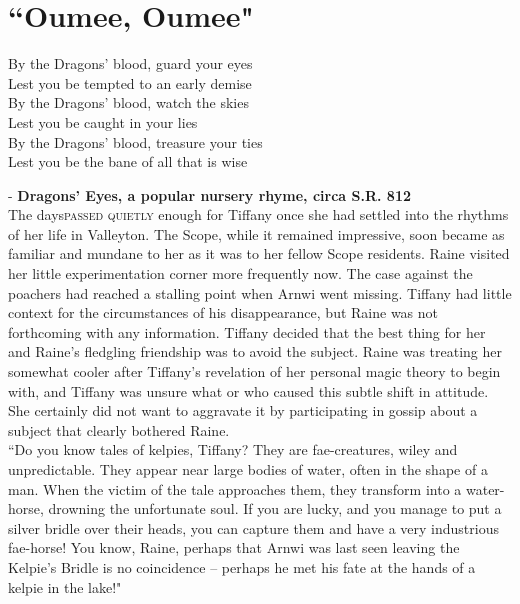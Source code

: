 \chapter{``Oumee, Oumee"}

\begin{center}
By the Dragons' blood, guard your eyes \\
Lest you be tempted to an early demise \\

By the Dragons' blood, watch the skies \\
Lest you be caught in your lies \\

By the Dragons' blood, treasure your ties \\
Lest you be the bane of all that is wise \\
\end{center}

- \textbf{Dragons' Eyes, a popular nursery rhyme, circa S.R. 812}\\

\lettrine{The days}{passed quietly} enough for Tiffany once she had settled into the rhythms of her life in Valleyton.
The Scope, while it remained impressive, soon became as familiar and mundane to her as it was to her fellow Scope residents. Raine visited her little experimentation corner more frequently now. The case against the poachers had reached a stalling point when Arnwi went missing. Tiffany had little context for the circumstances of his disappearance, but Raine was not forthcoming with any information. Tiffany decided that the best thing for her and Raine's fledgling friendship was to avoid the subject. Raine was treating her somewhat cooler after Tiffany's revelation of her personal magic theory to begin with, and Tiffany was unsure what or who caused this subtle shift in attitude. She certainly did not want to aggravate it by participating in gossip about a subject that clearly bothered Raine.\\

``Do you know tales of kelpies, Tiffany? They are fae-creatures, wiley and unpredictable. They appear near large bodies of water, often in the shape of a man. When the victim of the tale approaches them, they transform into a water-horse, drowning the unfortunate soul. If you are lucky, and you manage to put a silver bridle over their heads, you can capture them and have a very industrious fae-horse! You know, Raine, perhaps that Arnwi was last seen leaving the Kelpie's Bridle is no coincidence -- perhaps he met his fate at the hands of a kelpie in the lake!"\\

